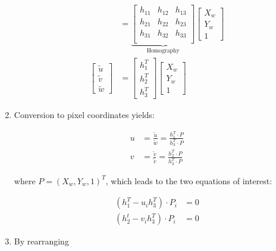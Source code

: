 \documentclass[10pt,a4paper]{scrartcl}
\begin{document}
\begin{multicols*}{2}
\begin{enumerate}
\begin{align*}
&=\underbrace{\begin{bmatrix}
h_{11}&h_{12}&h_{13}\\
h_{21}&h_{22}&h_{23}\\
h_{31}&h_{32}&h_{33}\\
\end{bmatrix}}_{\text{Homography}}\begin{bmatrix}
X_w\\Y_w\\1
\end{bmatrix}\\
\begin{bmatrix}
\tilde{u}\\\tilde{v}\\\tilde{w}
\end{bmatrix}&=\begin{bmatrix}
h_1^T\\h_2^T\\h_3^T
\end{bmatrix}
\begin{bmatrix}
X_w\\Y_w\\1
\end{bmatrix}
\end{align*}

\item Conversion to pixel coordinates yields:

\begin{align*}
u&=\frac{\tilde{u}}{\tilde{w}}=\frac{h_1^T\cdot P}{h_3^T\cdot P}\\
v&=\frac{\tilde{v}}{\tilde{v}}=\frac{h_2^T\cdot P}{h_3^T\cdot P}
\end{align*}

where $P=(X_w,Y_w,1)^T$, which leads to the two equations of interest:

\begin{align*}
(h_1^T-u_ih_3^T)\cdot P_i&=0\\
(h_2^t-v_ih_3^T)\cdot P_i&=0
\end{align*}

\item By rearranging


\end{enumerate}
\end{multicols*}
\end{document}

